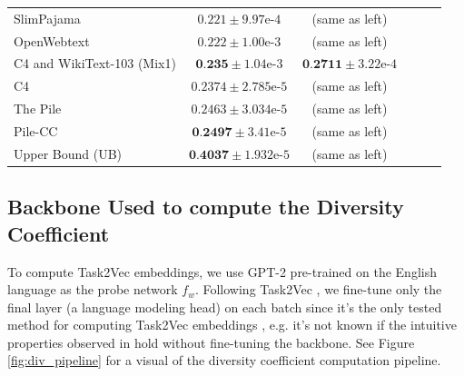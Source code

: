 \begin{table}[t]
\begin{center}
\begin{small}
\begin{sc}
\begin{tabular}{lccccr}
SlimPajama & $0.221 \pm 9.97\textrm{e-}4$ & (same as left) \\ %
OpenWebtext & $ 0.222 \pm  1.00\textrm{e-}3 $ & (same as left) \\ %

C4 and WikiText-103 (Mix1) & $ \textbf{0.235} \pm  1.04$\textrm{e-}3 & $\textbf{0.2711} \pm 3.22\textrm{e-}4$\\ %
C4 & $0.2374 \pm 2.785\textrm{e-}5$ & (same as left) \\

The Pile & $0.2463 \pm 3.034\textrm{e-}5$ & (same as left) \\
Pile-CC & $\textbf{0.2497} \pm 3.41\textrm{e-}5$ & (same as left) \\

Upper Bound (UB) & $\textbf{0.4037} \pm 1.932\textrm{e-}5$ & (same as left)\\
\bottomrule
\end{tabular}
\label{tab:div}
\end{sc}
\end{small}
\end{center}
\vskip -0.1in

\end{table}

\subsection{Backbone Used to compute the Diversity Coefficient}
To compute Task2Vec embeddings, we use GPT-2 \cite{gpt2} pre-trained on the English language as the probe network $f_w$. 
Following Task2Vec \citep{task2vec}, we fine-tune only the final layer (a language modeling head) on each batch since it's the only tested method for computing Task2Vec embeddings \cite{task2vec, curse_low_div, miranda2023pretraining}, e.g. it's not known if the intuitive properties observed in \citep{task2vec} hold without fine-tuning the backbone. 
See Figure \ref{fig:div_pipeline} for a visual of the diversity coefficient computation pipeline.

